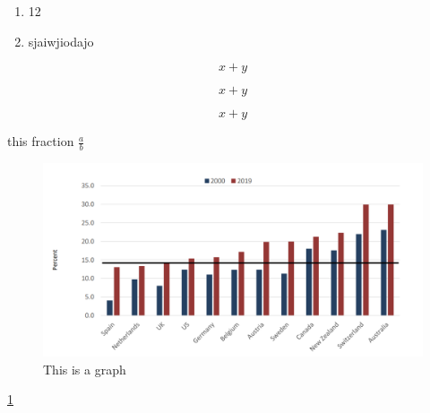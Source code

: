     \begin{enumerate}
        \item 12
        \item sjaiwjiodajo
    \end{enumerate}

    \begin{equation}
        x+y
    \end{equation}

    \begin{equation*}
        x+y
    \end{equation*}

    $$x+y$$

    this fraction $\frac{a}{b}$

    \begin{figure}[H]
        \centering
        \includegraphics[width=4.5in]{images/ch11/2.png}
        \caption{This is a graph}
        \label{123123}
    \end{figure}

    \ref{123123}